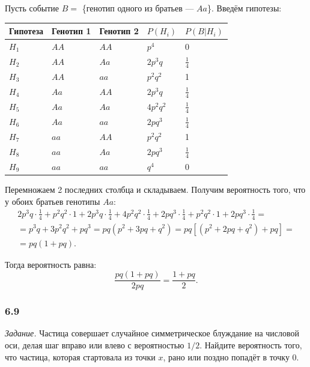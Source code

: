 Пусть событие  $B =$ \{генотип одного из братьев --- $Aa$\}.
Введём гипотезы:
\begin{center}
    \begin{tabular}{| l | l | l | l | l |}
    \hline
    Гипотеза & Генотип 1 & Генотип 2 & $P \left( H_i \right)$ & $P \left( \left. B \right| H_i \right)$ \\ \hline
    $H_1$ & $AA$ & $AA$ & $p^4$ & 0 \\ \hline
    $H_2$ & $AA$ & $Aa$ & $2p^3 q$ & $ \frac{1}{4} $ \\ \hline
    $H_3$ & $AA$ & $aa$ & $p^2 q^2$ & 1 \\ \hline
    $H_4$ & $Aa$ & $AA$ & $2p^3 q$ & $ \frac{1}{4} $ \\ \hline
    $H_5$ & $Aa$ & $Aa$ & $4p^2 q^2$ & $ \frac{1}{4} $ \\ \hline
    $H_6$ & $Aa$ & $aa$ & $2pq^3$ & $ \frac{1}{4} $ \\ \hline
    $H_7$ & $aa$ & $AA$ & $p^2 q^2$ & 1 \\ \hline
    $H_8$ & $aa$ & $Aa$ & $2pq^3$ & $ \frac{1}{4} $ \\ \hline
    $H_9$ & $aa$ & $aa$ & $q^4$ & 0 \\ \hline
    \end{tabular}
\end{center}

Перемножаем 2 последних столбца и складываем.
Получим вероятность того, что у обоих братьев генотипы $Aa$:
\begin{equation*}
\begin{split}
2p^3 q \cdot \frac{1}{4} +
p^2 q^2 \cdot 1 +
2p^3 q \cdot \frac{1}{4} + 4p^2 q^2 \cdot \frac{1}{4} + 2p q^3 \cdot \frac{1}{4} + p^2 q^2 \cdot 1 + 2pq^3 \cdot \frac{1}{4} = \\
= p^3 q + 3p^2 q^2 + pq^3 =
pq \left( p^2 + 3pq + q^2 \right) =
pq \left[ \left( p^2 + 2pq + q^2 \right) + pq \right] = \\
= pq \left( 1 + pq \right).
\end{split}
\end{equation*}

Тогда вероятность равна:
$$ \frac{pq \left( 1+pq \right) }{2pq} =
\frac{1+pq}{2}.$$

\subsubsection*{6.9}

\textit{Задание.} Частица совершает случайное симметрическое блуждание на числовой оси, делая шаг вправо или влево с вероятностью $1/2$.
Найдите вероятность того, что частица, которая стартовала из точки $x$, рано или поздно попадёт в точку $0$.

